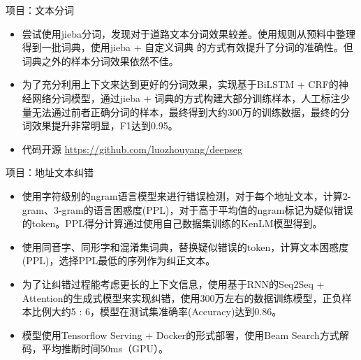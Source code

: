 \documentclass{resume}
\begin{document}
\begin{onehalfspacing}
 项目：文本分词
 \begin{itemize}
  \item 尝试使用jieba分词，发现对于道路文本分词效果较差。使用规则从预料中整理得到一批词典，使用jieba + 自定义词典 的方式有效提升了分词的准确性。但词典之外的样本分词效果依然不佳。
  \item 为了充分利用上下文来达到更好的分词效果，实现基于BiLSTM + CRF的神经网络分词模型，通过jieba + 词典的方式构建大部分训练样本，人工标注少量无法通过前者正确分词的样本，最终得到大约300万的训练数据，最终的分词效果提升非常明显，F1达到0.95。
  \item 代码开源 \href{https://github.com/luozhouyang/deepseg}{https://github.com/luozhouyang/deepseg}
\end{itemize}

项目：地址文本纠错
\begin{itemize}
  \item 使用字符级别的ngram语言模型来进行错误检测，对于每个地址文本，计算2-gram、3-gram的语言困惑度(PPL)，对于高于平均值的ngram标记为疑似错误的token。PPL得分计算通过使用自己数据集训练的KenLM模型得到。
  \item 使用同音字、同形字和混淆集词典，替换疑似错误的token，计算文本困惑度(PPL)，选择PPL最低的序列作为纠正文本。
  \item 为了让纠错过程能考虑更长的上下文信息，使用基于RNN的Seq2Seq + Attention的生成式模型来实现纠错，使用300万左右的数据训练模型，正负样本比例大约5 : 6，模型在测试集准确率(Accuracy)达到0.86。
  \item 模型使用Tensorflow Serving + Docker的形式部署，使用Beam Search方式解码，平均推断时间50ms（GPU）。
\end{itemize}
\end{onehalfspacing}




%
%
\end{document}
